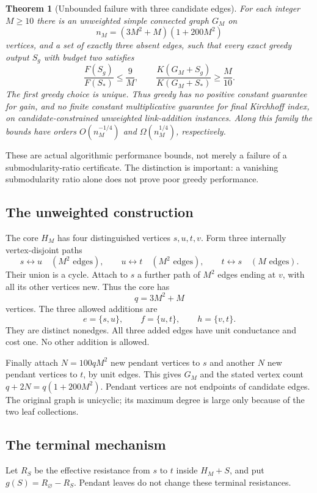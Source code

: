\documentclass[11pt,a4paper]{article}
\newtheorem{theorem}{Theorem}[section]
\theoremstyle{definition}\newtheorem{definition}[theorem]{Definition}
\theoremstyle{remark}\newtheorem{remark}[theorem]{Remark}
\numberwithin{equation}{section}
\begin{document}
\begin{theorem}[Unbounded failure with three candidate edges]\label{T10-main}
For each integer $M\ge10$ there is an unweighted simple connected graph $G_M$ on
\[
 n_M=(3M^2+M)(1+200M^2)
\]
vertices, and a set of exactly three absent edges, such that every exact greedy output $S_g$ with budget two satisfies
\[
 \frac{F(S_g)}{F(S_*)}\le\frac9M,
 \qquad
 \frac{K(G_M+S_g)}{K(G_M+S_*)}\ge\frac M{10}.
\]
The first greedy choice is unique. Thus greedy has no positive constant guarantee for gain, and no finite constant multiplicative guarantee for final Kirchhoff index, on candidate-constrained unweighted link-addition instances. Along this family the bounds have orders $O(n_M^{-1/4})$ and $\Omega(n_M^{1/4})$, respectively.
\end{theorem}
These are actual algorithmic performance bounds, not merely a failure of a submodularity-ratio certificate. The distinction is important: a vanishing submodularity ratio alone does not prove poor greedy performance.

\subsection{The unweighted construction}\label{T10-sec-2}
The core $H_M$ has four distinguished vertices $s,u,t,v$. Form three internally vertex-disjoint paths
\[
 s\longleftrightarrow u\quad(M^2\text{ edges}),\qquad
 u\longleftrightarrow t\quad(M^2\text{ edges}),\qquad
 t\longleftrightarrow s\quad(M\text{ edges}).
\]
Their union is a cycle. Attach to $s$ a further path of $M^2$ edges ending at $v$, with all its other vertices new. Thus the core has
\[
 q=3M^2+M
\]
vertices. The three allowed additions are
\[
 e=\{s,u\},\qquad f=\{u,t\},\qquad h=\{v,t\}.
\]
They are distinct nonedges. All three added edges have unit conductance and cost one. No other addition is allowed.

Finally attach $N=100qM^2$ new pendant vertices to $s$ and another $N$ new pendant vertices to $t$, by unit edges. This gives $G_M$ and the stated vertex count $q+2N=q(1+200M^2)$. Pendant vertices are not endpoints of candidate edges. The original graph is unicyclic; its maximum degree is large only because of the two leaf collections.

\subsection{The terminal mechanism}\label{T10-sec-3}
Let $R_S$ be the effective resistance from $s$ to $t$ inside $H_M+S$, and put $g(S)=R_\varnothing-R_S$. Pendant leaves do not change these terminal resistances.
\end{document}
